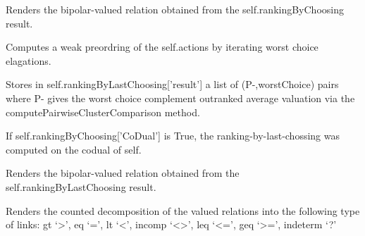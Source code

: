 \documentclass[letterpaper,10pt,english]{sphinxmanual}
\begin{document}
\begin{fulllineitems}
\begin{fulllineitems}
\end{fulllineitems}


\begin{fulllineitems}
\label{techDoc:digraphs.Digraph.computeRankingByChoosingRelation}
Renders the bipolar-valued relation obtained from
the self.rankingByChoosing result.

\end{fulllineitems}


\begin{fulllineitems}
\label{techDoc:digraphs.Digraph.computeRankingByLastChoosing}
Computes a weak preordring of the self.actions by iterating
worst choice elagations.

Stores in self.rankingByLastChoosing{[}'result'{]} a list of (P-,worstChoice) pairs
where P- gives the worst choice complement outranked
average valuation via the computePairwiseClusterComparison
method.

If self.rankingByChoosing{[}'CoDual'{]} is True, the ranking-by-last-chossing 
was computed on the codual of self.

\end{fulllineitems}


\begin{fulllineitems}
\label{techDoc:digraphs.Digraph.computeRankingByLastChoosingRelation}
Renders the bipolar-valued relation obtained from
the self.rankingByLastChoosing result.

\end{fulllineitems}


\begin{fulllineitems}
\label{techDoc:digraphs.Digraph.computeRelationalStructure}
Renders the counted decomposition of the valued relations into
the following type of links:
gt `\textgreater{}', eq `=', lt `\textless{}', incomp `\textless{}\textgreater{}',
leq `\textless{}=', geq `\textgreater{}=', indeterm `?'


\end{fulllineitems}
\end{fulllineitems}
\end{document}
